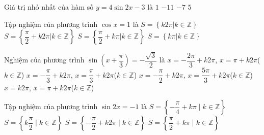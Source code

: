 \begin{ex}%
 	Giá trị nhỏ nhất của hàm số $y = 4\sin 2x - 3$ là
 	\choice
 	{$1$}
 	{$-11$}
 	{\True $-7$}
 	{$5$}
 \end{ex}

\begin{ex}%
	Tập nghiệm của phương trình $\cos x=1$ là
	\choice
	{\True $S=\left\{k2\pi\big| k\in \mathbb{Z}\right\}$}
	{$S=\left\{\dfrac{\pi}{2}+k2\pi\big| k\in \mathbb{Z}\right\}$}
	{$S=\left\{\dfrac{\pi}{2}+k\pi\big| k\in \mathbb{Z}\right\}$}
	{$S=\left\{k\pi\big| k\in \mathbb{Z}\right\}$}
\end{ex}

\begin{ex}%
	Nghiệm của phương trình $\sin\left(x+\dfrac{\pi}{3}\right)=-\dfrac{\sqrt{3}}{2}$ là
	\choice
	{\True $x=-\dfrac{2\pi}{3}+k2\pi$, $x=\pi+k2\pi$($k\in\mathbb{Z}$)}
	{$x=-\dfrac{\pi}{3}+k2\pi$, $x=\dfrac{\pi}{3}+k2\pi$($k\in\mathbb{Z}$)}
	{$x=-\dfrac{\pi}{2}+k2\pi$, $x=\dfrac{5\pi}{3}+k2\pi$($k\in\mathbb{Z}$)}
	{$x=k2\pi$, $x=\pi+k2\pi$($k\in\mathbb{Z}$)}
\end{ex}

\begin{ex}%
	Tập nghiệm của phương trình $\sin 2x=-1$ là
	\choice
	{\True $S=\left\{-\dfrac{\pi}{4}+k\pi \mid k\in\mathbb{Z}\right\}$}
	{$S=\left\{k\dfrac{\pi}{2} \mid k\in\mathbb{Z}\right\}$}
	{$S=\left\{-\dfrac{\pi}{2}+k2\pi \mid k\in\mathbb{Z}\right\}$}
	{$S=\left\{\dfrac{\pi}{2}+k\pi \mid k\in\mathbb{Z}\right\}$}
\end{ex}

